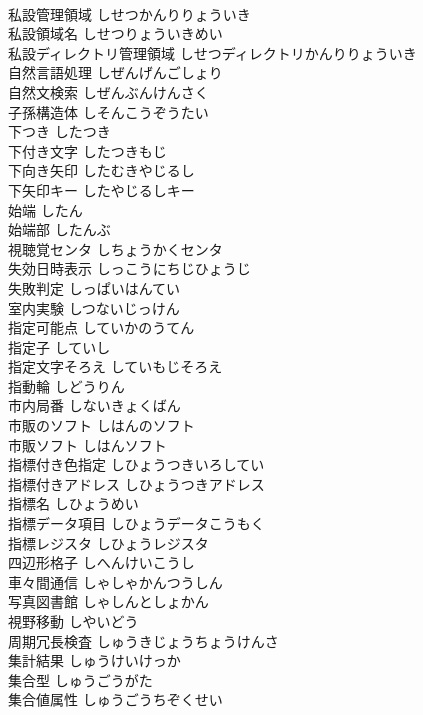 \documentclass[8pt]{extreport}
\begin{document}
\begin{CJK}{UTF8}{min}
\\	私設管理領域	しせつかんりりょういき	
\\	私設領域名	しせつりょういきめい	
\\	私設ディレクトリ管理領域	しせつディレクトリかんりりょういき	
\\	自然言語処理	しぜんげんごしょり	
\\	自然文検索	しぜんぶんけんさく	
\\	子孫構造体	しそんこうぞうたい	
\\	下つき	したつき	
\\	下付き文字	したつきもじ	
\\	下向き矢印	したむきやじるし	
\\	下矢印キー	したやじるしキー	
\\	始端	したん	
\\	始端部	したんぶ	
\\	視聴覚センタ	しちょうかくセンタ	
\\	失効日時表示	しっこうにちじひょうじ	
\\	失敗判定	しっぱいはんてい	
\\	室内実験	しつないじっけん	
\\	指定可能点	していかのうてん	
\\	指定子	していし	
\\	指定文字そろえ	していもじそろえ	
\\	指動輪	しどうりん	
\\	市内局番	しないきょくばん	
\\	市販のソフト	しはんのソフト	
\\	市販ソフト	しはんソフト	
\\	指標付き色指定	しひょうつきいろしてい	
\\	指標付きアドレス	しひょうつきアドレス	
\\	指標名	しひょうめい	
\\	指標データ項目	しひょうデータこうもく	
\\	指標レジスタ	しひょうレジスタ	
\\	四辺形格子	しへんけいこうし	
\\	車々間通信	しゃしゃかんつうしん	
\\	写真図書館	しゃしんとしょかん	
\\	視野移動	しやいどう	
\\	周期冗長検査	しゅうきじょうちょうけんさ	
\\	集計結果	しゅうけいけっか	
\\	集合型	しゅうごうがた	
\\	集合値属性	しゅうごうちぞくせい	

\end{CJK}
\end{document}
